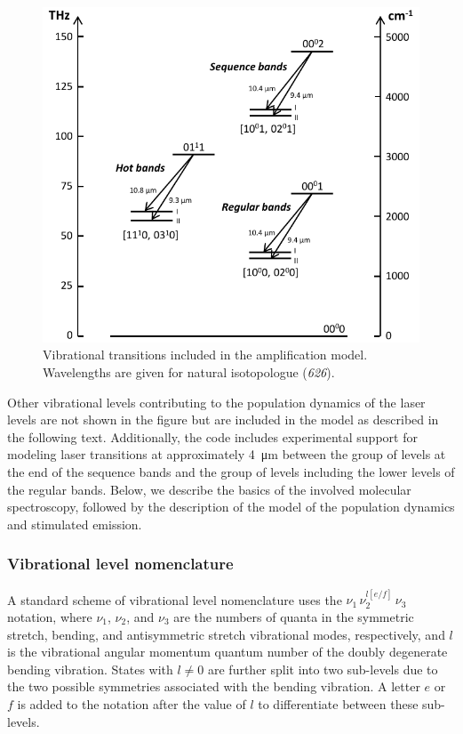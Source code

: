 \documentclass{report}
\begin{document}
\begin{figure}[ht]
\centering
\includegraphics[width=120mm]{images/laser-transitions}
\caption{Vibrational transitions included in the amplification model. Wavelengths are given for natural  isotopologue (\textit{626}).}\label{fig:laser-transitions}
\end{figure}

Other vibrational levels contributing to the population dynamics of the laser levels are not shown in the figure but are included in the model as described in the following text. Additionally, the code includes experimental support for modeling laser transitions at approximately \SI{4}{\micro\meter} between the group of levels at the end of the sequence bands and the group of levels including the lower levels of the regular bands. Below, we describe the basics of the involved molecular spectroscopy, followed by the description of the model of the population dynamics and stimulated emission.



\subsubsection{Vibrational level nomenclature}

A standard scheme of vibrational level nomenclature uses the $\nu_1\,\nu_2^{l[e/f]}\,\nu_3$ notation, where $\nu_1$, $\nu_2$, and $\nu_3$ are the numbers of quanta in the symmetric stretch, bending, and antisymmetric stretch vibrational modes, respectively, and $l$ is the vibrational angular momentum quantum number of the doubly degenerate bending vibration. States with $l \neq 0$ are further split into two sub-levels due to the two possible symmetries associated with the bending vibration. A letter $e$ or $f$ is added to the notation after the value of $l$ to differentiate between these sub-levels.
\end{document}
